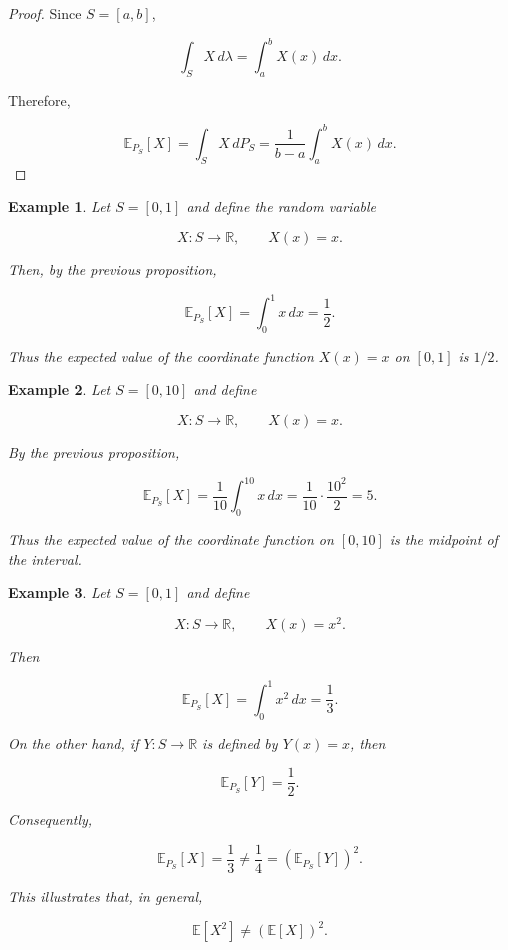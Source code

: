 \documentclass[10pt,a4paper]{book}
\newtheorem{example}{Example}[section]
\begin{document}
\begin{proof}
    Since $S=[a,b]$,

    $$
        \int_S X\,d\lambda
        =
        \int_a^b X(x)\,dx.
    $$

    Therefore,

    $$
        \boxed{
            \mathbb E_{P_S}[X]
            =
            \int_S X\,dP_S
            =
            \frac{1}{b-a}\int_a^b X(x)\,dx
        }.
    $$

\end{proof}



\begin{example}

    Let $S=[0,1]$ and define the random variable

    $$
        X:S\to\mathbb R,
        \qquad
        X(x)=x.
    $$

    Then, by the previous proposition,

    $$
        \mathbb E_{P_S}[X]
        =
        \int_0^1x\,dx
        =
        \frac12.
    $$

    Thus the expected value of the coordinate function $X(x)=x$ on $[0,1]$ is $1/2$.

\end{example}

\begin{example}

    Let $S=[0,10]$ and define

    $$
        X:S\to\mathbb R,
        \qquad
        X(x)=x.
    $$

    By the previous proposition,

    $$
        \mathbb E_{P_S}[X]
        =
        \frac1{10}\int_0^{10}x\,dx
        =
        \frac1{10}\cdot\frac{10^2}{2}
        =
        5.
    $$

    Thus the expected value of the coordinate function on $[0,10]$ is the midpoint of the interval.

\end{example}

\begin{example}

    Let $S=[0,1]$ and define

    $$
        X:S\to\mathbb R,
        \qquad
        X(x)=x^2.
    $$

    Then

    $$
        \mathbb E_{P_S}[X]
        =
        \int_0^1x^2\,dx
        =
        \frac13.
    $$

    On the other hand, if $Y:S\to\mathbb R$ is defined by $Y(x)=x$, then

    $$
        \mathbb E_{P_S}[Y]=\frac12.
    $$

    Consequently,

    $$
        \mathbb E_{P_S}[X]
        =
        \frac13
        \neq
        \frac14
        =
        \left(\mathbb E_{P_S}[Y]\right)^2.
    $$

    This illustrates that, in general,

    $$
        \mathbb E[X^2]\neq(\mathbb E[X])^2.
    $$

\end{example}
\end{document}
